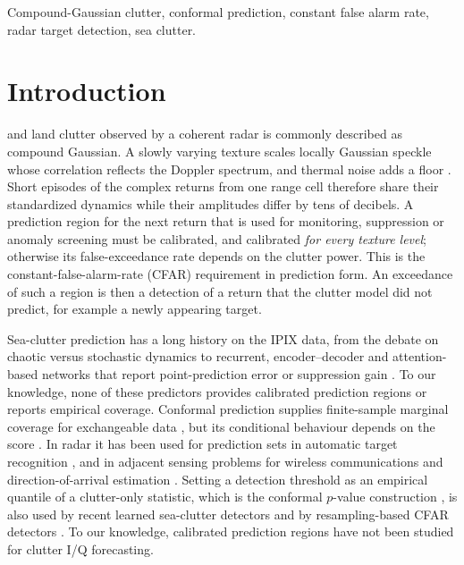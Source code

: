 \documentclass[journal]{IEEEtran}
\begin{document}
\begin{IEEEkeywords}
Compound-Gaussian clutter, conformal prediction, constant false alarm rate, radar target detection, sea clutter.
\end{IEEEkeywords}

\section{Introduction}
 and land clutter observed by a coherent radar is commonly described as compound Gaussian. A slowly varying texture scales locally Gaussian speckle whose correlation reflects the Doppler spectrum, and thermal noise adds a floor \cite{ward2013,conte1995,ollila2012}. Short episodes of the complex returns from one range cell therefore share their standardized dynamics while their amplitudes differ by tens of decibels. A prediction region for the next return that is used for monitoring, suppression or anomaly screening must be calibrated, and calibrated \emph{for every texture level}; otherwise its false-exceedance rate depends on the clutter power. This is the constant-false-alarm-rate (CFAR) requirement in prediction form. An exceedance of such a region is then a detection of a return that the clutter model did not predict, for example a newly appearing target.

Sea-clutter prediction has a long history on the IPIX data, from the debate on chaotic versus stochastic dynamics \cite{haykin1995,haykin2002,unsworth2002} to recurrent, encoder--decoder and attention-based networks that report point-prediction error or suppression gain \cite{ma2019,qu2023,li2025taes}. To our knowledge, none of these predictors provides calibrated prediction regions or reports empirical coverage. Conformal prediction supplies finite-sample marginal coverage for exchangeable data \cite{lei2018}, but its conditional behaviour depends on the score \cite{barber2021limits,gibbs2025,dewolf2025}. In radar it has been used for prediction sets in automatic target recognition \cite{spie2025,nguyen2026spie}, and in adjacent sensing problems for wireless communications \cite{cohen2023} and direction-of-arrival estimation \cite{khurjekar2023}. Setting a detection threshold as an empirical quantile of a clutter-only statistic, which is the conformal $p$-value construction \cite{bates2023}, is also used by recent learned sea-clutter detectors \cite{bai2026cvae,rouzoumka2026ood,diskin2022cfarnet} and by resampling-based CFAR detectors \cite{qu2024sieve}. To our knowledge, calibrated prediction regions have not been studied for clutter I/Q forecasting.
\end{document}
